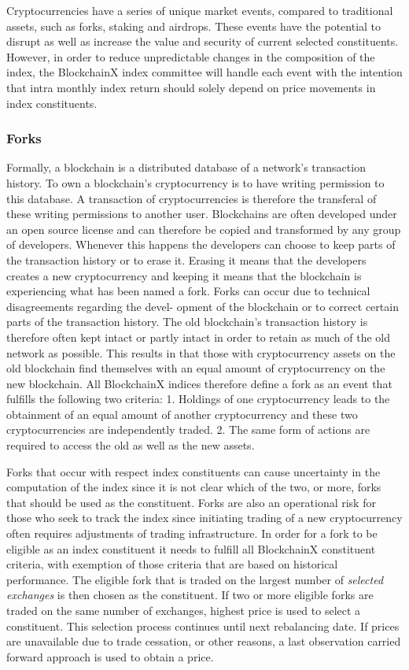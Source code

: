 \documentclass{article}
\begin{document}
Cryptocurrencies have a series of unique market events, compared to
traditional assets, such as forks, staking and airdrops. These events
have the potential to disrupt as well as increase the value and security
of current selected constituents. However, in order to reduce
unpredictable changes in the composition of the index, the BlockchainX
index committee will handle each event with the intention that intra
monthly index return should solely depend on price movements in index
constituents.

\subsubsection{Forks}\label{forks}

Formally, a blockchain is a distributed database of a network's
transaction history. To own a blockchain's cryptocurrency is to have
writing permission to this database. A transaction of cryptocurrencies
is therefore the transferal of these writing permissions to another
user. Blockchains are often developed under an open source license and
can therefore be copied and transformed by any group of developers.
Whenever this happens the developers can choose to keep parts of the
transaction history or to erase it. Erasing it means that the developers
creates a new cryptocurrency and keeping it means that the blockchain is
experiencing what has been named a fork. Forks can occur due to
technical disagreements regarding the devel- opment of the blockchain or
to correct certain parts of the transaction history. The old
blockchain's transaction history is therefore often kept intact or
partly intact in order to retain as much of the old network as possible.
This results in that those with cryptocurrency assets on the old
blockchain find themselves with an equal amount of cryptocurrency on the
new blockchain. All BlockchainX indices therefore define a fork as an
event that fulfills the following two criteria: 1. Holdings of one
cryptocurrency leads to the obtainment of an equal amount of another
cryptocurrency and these two cryptocurrencies are independently traded.
2. The same form of actions are required to access the old as well as
the new assets.

Forks that occur with respect index constituents can cause uncertainty
in the computation of the index since it is not clear which of the two,
or more, forks that should be used as the constituent. Forks are also an
operational risk for those who seek to track the index since initiating
trading of a new cryptocurrency often requires adjustments of trading
infrastructure. In order for a fork to be eligible as an index
constituent it needs to fulfill all BlockchainX constituent criteria,
with exemption of those criteria that are based on historical
performance. The eligible fork that is traded on the largest number of
\emph{selected exchanges} is then chosen as the constituent. If two or
more eligible forks are traded on the same number of exchanges, highest
price is used to select a constituent. This selection process continues
until next rebalancing date. If prices are unavailable due to trade
cessation, or other reasons, a last observation carried forward approach
is used to obtain a price.
\end{document}
